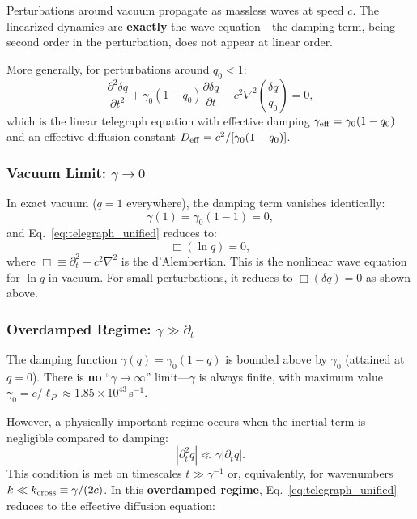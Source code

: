 \documentclass[aps,prd,twocolumn,showpacs,superscriptaddress,preprintnumbers]{revtex4-2}
\begin{document}
Perturbations around vacuum propagate as massless waves at speed $c$.
The linearized dynamics are \textbf{exactly} the wave equation---the damping term, being second order in the perturbation, does not appear at linear order.

More generally, for perturbations around $q_0<1$:
\begin{equation}
\frac{\partial^2 \delta q}{\partial t^2} + \gamma_0(1-q_0)\frac{\partial \delta q}{\partial t} - c^2\nabla^2\left(\frac{\delta q}{q_0}\right) = 0,
\label{eq:linear_telegraph_general}
\end{equation}
which is the linear telegraph equation with effective damping $\gamma_{\rm eff}=\gamma_0(1-q_0)$ and an effective diffusion constant $D_{\rm eff}=c^2/[\gamma_0(1-q_0)]$.

\subsubsection{Vacuum Limit: $\gamma\to0$}

In exact vacuum ($q=1$ everywhere), the damping term vanishes identically:
\begin{equation}
\gamma(1) = \gamma_0(1-1) = 0,
\end{equation}
and Eq.~\eqref{eq:telegraph_unified} reduces to:
\begin{equation}
\boxed{\Box(\ln q) = 0},
\label{eq:box_lnq}
\end{equation}
where $\Box\equiv\partial_t^2-c^2\nabla^2$ is the d'Alembertian.
This is the nonlinear wave equation for $\ln q$ in vacuum.
For small perturbations, it reduces to $\Box(\delta q)=0$ as shown above.

\subsubsection{Overdamped Regime: $\gamma\gg\partial_t$}

The damping function $\gamma(q)=\gamma_0(1-q)$ is bounded above by $\gamma_0$ (attained at $q=0$).
There is \textbf{no} ``$\gamma\to\infty$'' limit---$\gamma$ is always finite, with maximum value $\gamma_0=c/\ell_P\approx1.85\times10^{43}$\,s$^{-1}$.

However, a physically important regime occurs when the inertial term is negligible compared to damping:
\begin{equation}
|\partial_t^2 q| \ll \gamma|\partial_t q|.
\end{equation}
This condition is met on timescales $t\gg\gamma^{-1}$ or, equivalently, for wavenumbers $k\ll k_{\rm cross}\equiv\gamma/(2c)$.
In this \textbf{overdamped regime}, Eq.~\eqref{eq:telegraph_unified} reduces to the effective diffusion equation:
\end{document}

